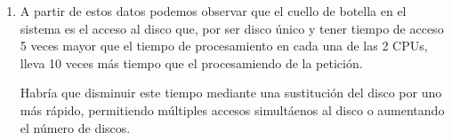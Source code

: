 \begin{problem}[17]
\begin{enumerate}
\item

A partir de estos datos podemos observar que el cuello de botella en el sistema es el acceso al disco que, por ser disco único y tener tiempo de acceso 5 veces mayor que el tiempo de procesamiento en cada una de las 2 CPUs, lleva 10 veces más tiempo que el procesamiendo de la petición.

Habría que disminuir este tiempo mediante una sustitución del disco por uno más rápido, permitiendo múltiples accesos simultáenos al disco o aumentando el número de discos.

\end{enumerate}

\end{problem}


